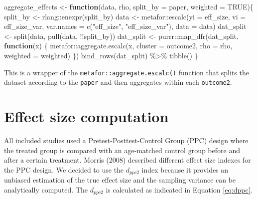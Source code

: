 \documentclass[
]{article}
\newenvironment{Shaded}{\begin{snugshade}}{\end{snugshade}}
\newcommand{\AttributeTok}[1]{\textcolor[rgb]{0.77,0.63,0.00}{#1}}
\newcommand{\ConstantTok}[1]{\textcolor[rgb]{0.00,0.00,0.00}{#1}}
\newcommand{\ControlFlowTok}[1]{\textcolor[rgb]{0.13,0.29,0.53}{\textbf{#1}}}
\newcommand{\FunctionTok}[1]{\textcolor[rgb]{0.00,0.00,0.00}{#1}}
\newcommand{\NormalTok}[1]{#1}
\newcommand{\OtherTok}[1]{\textcolor[rgb]{0.56,0.35,0.01}{#1}}
\newcommand{\SpecialCharTok}[1]{\textcolor[rgb]{0.00,0.00,0.00}{#1}}
\newcommand{\StringTok}[1]{\textcolor[rgb]{0.31,0.60,0.02}{#1}}
\begin{document}
\begin{Shaded}
\begin{Highlighting}[]
\NormalTok{aggregate\_effects }\OtherTok{\textless{}{-}} \ControlFlowTok{function}\NormalTok{(data, rho, }\AttributeTok{split\_by =}\NormalTok{ paper, }\AttributeTok{weighted =} \ConstantTok{TRUE}\NormalTok{)\{}
\NormalTok{    split\_by }\OtherTok{\textless{}{-}}\NormalTok{ rlang}\SpecialCharTok{::}\FunctionTok{enexpr}\NormalTok{(split\_by)}
\NormalTok{    data }\OtherTok{\textless{}{-}}\NormalTok{ metafor}\SpecialCharTok{::}\FunctionTok{escalc}\NormalTok{(}\AttributeTok{yi =}\NormalTok{ eff\_size, }\AttributeTok{vi =}\NormalTok{ eff\_size\_var, }
                   \AttributeTok{var.names =} \FunctionTok{c}\NormalTok{(}\StringTok{"eff\_size"}\NormalTok{, }\StringTok{"eff\_size\_var"}\NormalTok{),}
                   \AttributeTok{data =}\NormalTok{ data)}
\NormalTok{    dat\_split }\OtherTok{\textless{}{-}} \FunctionTok{split}\NormalTok{(data, }\FunctionTok{pull}\NormalTok{(data, }\SpecialCharTok{!!}\NormalTok{split\_by))}
\NormalTok{    dat\_split }\OtherTok{\textless{}{-}}\NormalTok{ purrr}\SpecialCharTok{::}\FunctionTok{map\_dfr}\NormalTok{(dat\_split, }\ControlFlowTok{function}\NormalTok{(x) \{}
\NormalTok{        metafor}\SpecialCharTok{::}\FunctionTok{aggregate.escalc}\NormalTok{(x, }
                                  \AttributeTok{cluster =}\NormalTok{ outcome2, }
                                  \AttributeTok{rho =}\NormalTok{ rho, }
                                  \AttributeTok{weighted =}\NormalTok{ weighted)}
\NormalTok{    \})}
    \FunctionTok{bind\_rows}\NormalTok{(dat\_split) }\SpecialCharTok{\%\textgreater{}\%} \FunctionTok{tibble}\NormalTok{()}
\NormalTok{\}}
\end{Highlighting}
\end{Shaded}

\normalsize

This is a wrapper of the \texttt{metafor::aggregate.escalc()} function that splits the dataset according to the \texttt{paper} and then aggregates within each \texttt{outcome2}.

\hypertarget{effectsize}{%
\section{Effect size computation}\label{effectsize}}

All included studies used a Pretest-Posttest-Control Group (PPC) design where the treated group is compared with an age-matched control group before and after a certain treatment. Morris (2008) described different effect size indexes for the PPC design. We decided to use the \(d_{ppc2}\) index because it provides an unbiased estimation of the true effect size and the sampling variance can be analytically computed. The \(d_{ppc2}\) is calculated as indicated in Equation \eqref{eq:dppc}.
\end{document}
